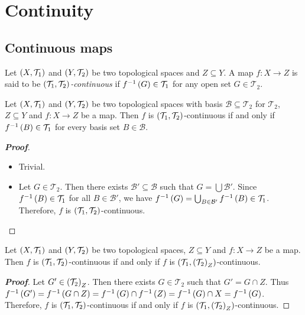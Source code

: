 \chapter{Continuity}

\section{Continuous maps}

\begin{definition}
  Let $\left(X,\mathcal{T}_1\right)$ and $\left(Y,\mathcal{T}_2\right)$ be two topological spaces and $Z\subseteq Y$. A map $f:X\rightarrow Z$ is said to be \textit{$\left(\mathcal{T}_1,\mathcal{T}_2\right)$-continuous} if $f^{-1}\left(G\right)\in\mathcal{T}_1$ for any open set $G\in\mathcal{T}_2$. 
\end{definition}

\begin{proposition}
  Let $\left(X,\mathcal{T}_1\right)$ and $\left(Y,\mathcal{T}_2\right)$ be two topological spaces with basis $\mathcal{B}\subseteq\mathcal{T}_2$ for $\mathcal{T}_2$, $Z\subseteq Y$ and $f:X\rightarrow Z$ be a map. Then $f$ is $\left(\mathcal{T}_1,\mathcal{T}_2\right)$-continuous if and only if $f^{-1}\left(B\right)\in\mathcal{T}_1$ for every basis set $B\in\mathcal{B}$.

  \begin{proof}[\rm\textbf{Proof}]
    \hfill
    \begin{itemize}
      \item[\boxed{\Rightarrow}] Trivial.
      \item[\boxed{\Leftarrow}] Let $G\in\mathcal{T}_2$. Then there exists $\mathcal{B}'\subseteq\mathcal{B}$ such that $G=\bigcup{\mathcal{B}'}$. Since $f^{-1}\left(B\right)\in\mathcal{T}_1$ for all $B\in\mathcal{B}'$, we have $f^{-1}\left(G\right)=\bigcup_{B\in\mathcal{B}'}{f^{-1}\left(B\right)}\in\mathcal{T}_1$. Therefore, $f$ is $\left(\mathcal{T}_1,\mathcal{T}_2\right)$-continuous.
    \end{itemize}
  \end{proof}
\end{proposition}

\begin{proposition}
  Let $\left(X,\mathcal{T}_1\right)$ and $\left(Y,\mathcal{T}_2\right)$ be two topological spaces, $Z\subseteq Y$ and $f:X\rightarrow Z$ be a map. Then $f$ is $\left(\mathcal{T}_1,\mathcal{T}_2\right)$-continuous if and only if $f$ is $\left(\mathcal{T}_1,\left(\mathcal{T}_2\right)_Z\right)$-continuous.

  \begin{proof}[\rm\textbf{Proof}]
    Let $G'\in\left(\mathcal{T}_2\right)_Z$. Then there exists $G\in\mathcal{T}_2$ such that $G'=G\cap Z$. Thus $f^{-1}\left(G'\right)=f^{-1}\left(G\cap Z\right)=f^{-1}\left(G\right)\cap f^{-1}\left(Z\right)=f^{-1}\left(G\right)\cap X=f^{-1}\left(G\right)$. Therefore, $f$ is $\left(\mathcal{T}_1,\mathcal{T}_2\right)$-continuous if and only if $f$ is $\left(\mathcal{T}_1,\left(\mathcal{T}_2\right)_Z\right)$-continuous.
  \end{proof}
\end{proposition}


